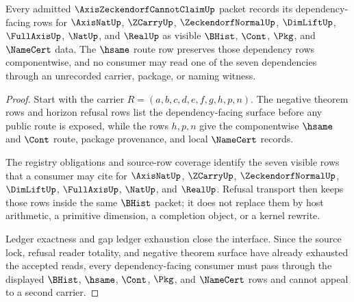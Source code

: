 \begin{theorem}
\label{thm:axis-zeckendorf-cannot-claim-dependency-interface}
Every admitted $\AxisZeckendorfCannotClaimUp$ packet records its dependency-facing rows for $\AxisNatUp$, $\ZCarryUp$, $\ZeckendorfNormalUp$, $\DimLiftUp$, $\FullAxisUp$, $\NatUp$, and $\RealUp$ as visible $\BHist$, $\Cont$, $\Pkg$, and $\NameCert$ data. The $\hsame$ route row preserves those dependency rows componentwise, and no consumer may read one of the seven dependencies through an unrecorded carrier, package, or naming witness.
\end{theorem}
\begin{proof}
Start with the carrier $R=(a,b,c,d,e,f,g,h,p,n)$. The negative theorem rows and horizon refusal rows list the dependency-facing surface before any public route is exposed, while the rows $h,p,n$ give the componentwise $\hsame$ and $\Cont$ route, package provenance, and local $\NameCert$ records.

The registry obligations and source-row coverage identify the seven visible rows that a consumer may cite for $\AxisNatUp$, $\ZCarryUp$, $\ZeckendorfNormalUp$, $\DimLiftUp$, $\FullAxisUp$, $\NatUp$, and $\RealUp$. Refusal transport then keeps those rows inside the same $\BHist$ packet; it does not replace them by host arithmetic, a primitive dimension, a completion object, or a kernel rewrite.

Ledger exactness and gap ledger exhaustion close the interface. Since the source lock, refusal reader totality, and negative theorem surface have already exhausted the accepted reads, every dependency-facing consumer must pass through the displayed $\BHist$, $\hsame$, $\Cont$, $\Pkg$, and $\NameCert$ rows and cannot appeal to a second carrier.
\end{proof}

